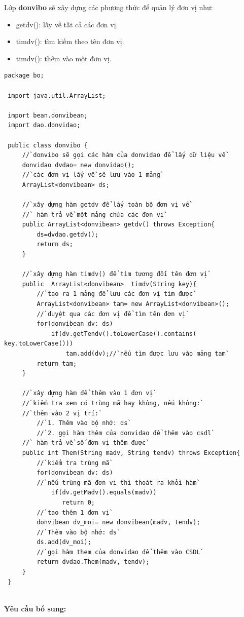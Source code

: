  Lớp \textbf{donvibo} sẽ xây dựng các phương thức để quản lý đơn vị như:
 \begin{itemize}
 	\item getdv(): lấy về tất cả các đơn vị.
 	\item timdv(): tìm kiếm theo tên đơn vị.
 	\item timdv(): thêm vào một đơn vị.
 \end{itemize} 
 \begin{lstlisting}[escapechar=`]
 package bo;
 
 import java.util.ArrayList;
 
 import bean.donvibean;
 import dao.donvidao;
 
 public class donvibo {
	 //`donvibo sẽ gọi các hàm của donvidao để lấy dữ liệu về`
	 donvidao dvdao= new donvidao();
	 //`các đơn vị lấy về sẽ lưu vào 1 mảng`
	 ArrayList<donvibean> ds;
	 
	 //`xây dựng hàm getdv để lấy toàn bộ đơn vị về`
	 //` hàm trả về một mảng chứa các đơn vị`
	 public ArrayList<donvibean> getdv() throws Exception{
		 ds=dvdao.getdv();
		 return ds;
	 }
	 
	 //`xây dựng hàm timdv() để tìm tương đối tên đơn vị`
	 public  ArrayList<donvibean>  timdv(String key){
		 //`tạo ra 1 mảng để lưu các đơn vị tìm được`
		 ArrayList<donvibean> tam= new ArrayList<donvibean>();
		 //`duyệt qua các đơn vị để tìm tên đơn vị`
		 for(donvibean dv: ds)
			 if(dv.getTendv().toLowerCase().contains( key.toLowerCase()))
				 tam.add(dv);//`nếu tìm được lưu vào mảng tam`
		 return tam;
	 }
	 
	 //`xây dựng hàm để thêm vào 1 đơn vị`
	 //`kiểm tra xem có trùng mã hay không, nếu không:`
	 //`thêm vào 2 vị trí:`
		 //`1. Thêm vào bộ nhớ: ds`
		 //`2. gọi hàm thêm của donvidao để thêm vào csdl`
	 //` hàm trả về số đơn vị thêm được`
	 public int Them(String madv, String tendv) throws Exception{
		 //`kiểm tra trùng mã`
		 for(donvibean dv: ds)
		 //`nếu trùng mã đơn vị thì thoát ra khỏi hàm`
			 if(dv.getMadv().equals(madv))
		 		return 0;
		 //`tao thêm 1 đơn vị`
		 donvibean dv_moi= new donvibean(madv, tendv);
		 //`Thêm vào bộ nhớ: ds`
		 ds.add(dv_moi);
		 //`gọi hàm them của donvidao để thêm vào CSDL`
		 return dvdao.Them(madv, tendv);
	 }
 }
 
 \end{lstlisting}
 \textbf{Yêu cầu bổ sung:}
 
